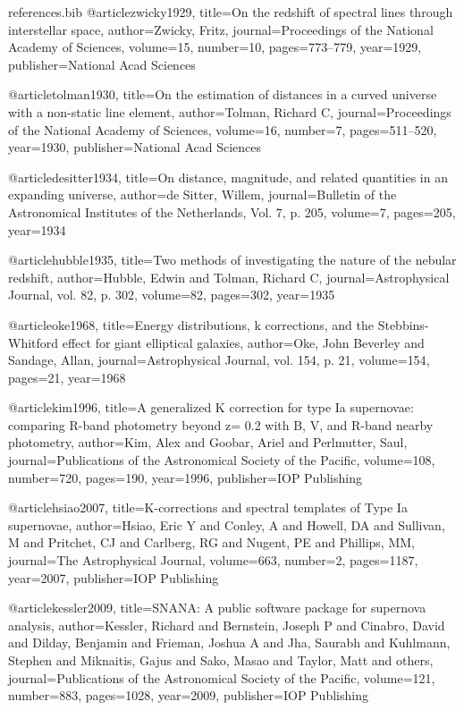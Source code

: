 \begin{filecontents}{references.bib}
@article{zwicky1929,
  title={On the redshift of spectral lines through interstellar space},
  author={Zwicky, Fritz},
  journal={Proceedings of the National Academy of Sciences},
  volume={15},
  number={10},
  pages={773--779},
  year={1929},
  publisher={National Acad Sciences}
}

@article{tolman1930,
  title={On the estimation of distances in a curved universe with a non-static line element},
  author={Tolman, Richard C},
  journal={Proceedings of the National Academy of Sciences},
  volume={16},
  number={7},
  pages={511--520},
  year={1930},
  publisher={National Acad Sciences}
}

@article{desitter1934,
  title={On distance, magnitude, and related quantities in an expanding universe},
  author={de Sitter, Willem},
  journal={Bulletin of the Astronomical Institutes of the Netherlands, Vol. 7, p. 205},
  volume={7},
  pages={205},
  year={1934}
}

@article{hubble1935,
  title={Two methods of investigating the nature of the nebular redshift},
  author={Hubble, Edwin and Tolman, Richard C},
  journal={Astrophysical Journal, vol. 82, p. 302},
  volume={82},
  pages={302},
  year={1935}
}

@article{oke1968,
  title={Energy distributions, k corrections, and the Stebbins-Whitford effect for giant elliptical galaxies},
  author={Oke, John Beverley and Sandage, Allan},
  journal={Astrophysical Journal, vol. 154, p. 21},
  volume={154},
  pages={21},
  year={1968}
}

@article{kim1996,
  title={A generalized K correction for type Ia supernovae: comparing R-band photometry beyond z= 0.2 with B, V, and R-band nearby photometry},
  author={Kim, Alex and Goobar, Ariel and Perlmutter, Saul},
  journal={Publications of the Astronomical Society of the Pacific},
  volume={108},
  number={720},
  pages={190},
  year={1996},
  publisher={IOP Publishing}
}

@article{hsiao2007,
  title={K-corrections and spectral templates of Type Ia supernovae},
  author={Hsiao, Eric Y and Conley, A and Howell, DA and Sullivan, M and Pritchet, CJ and Carlberg, RG and Nugent, PE and Phillips, MM},
  journal={The Astrophysical Journal},
  volume={663},
  number={2},
  pages={1187},
  year={2007},
  publisher={IOP Publishing}
}

@article{kessler2009,
  title={SNANA: A public software package for supernova analysis},
  author={Kessler, Richard and Bernstein, Joseph P and Cinabro, David and Dilday, Benjamin and Frieman, Joshua A and Jha, Saurabh and Kuhlmann, Stephen and Miknaitis, Gajus and Sako, Masao and Taylor, Matt and others},
  journal={Publications of the Astronomical Society of the Pacific},
  volume={121},
  number={883},
  pages={1028},
  year={2009},
  publisher={IOP Publishing}
}


\end{filecontents}
